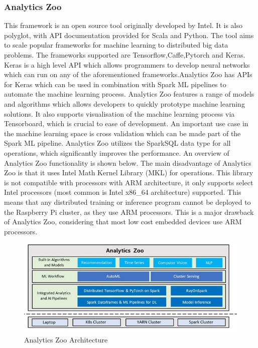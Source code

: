     \subsubsection{Analytics Zoo}
        \begin{flushleft}
        This framework is an open source tool originally developed by Intel. It is also polyglot, with API documentation provided for Scala and Python. The tool aims to scale popular frameworks for machine learning to distributed big data problems. The frameworks supported are Tensorflow,Caffe,Pytorch and Keras. Keras is a high level API which allows programmers to develop neural networks which can run on any of the aforementioned frameworks.Analytics Zoo has APIs for Keras which can be used in combination with Spark ML pipelines to automate the machine learning process. Analytics Zoo features a range of models and algorithms which allows developers to quickly prototype machine learning solutions. It also supports visualisation of the machine learning process via Tensorboard, which is crucial to ease of development. An important use case in the machine learning space is cross validation which can be made part of the Spark ML pipeline. Analytics Zoo utilizes the SparkSQL data type for all operations, which significantly improves the performance. An overview of Analytics Zoo functionality is shown below. The main disadvantage of Analytics Zoo is that it uses Intel Math Kernel Library (MKL) for operations. This library is not compatible with processors with ARM architecture, it only supports select Intel processors (most common is Intel x86\_64 architecture) supported. This means that any distributed training or inference program cannot be deployed to the Raspberry Pi cluster, as they use ARM processors. This is a major drawback of Analytics Zoo, considering that most  low cost embedded devices use ARM processors.  
         \end{flushleft}
        
       
     
        \begin{figure}[H]
              
          \includegraphics[scale=0.8]{images/AnalyticsZoo.JPG}
          \caption{Analytics Zoo Architecture}
          \label{fig:AnalyticsZoo}
                  
        \end{figure}
